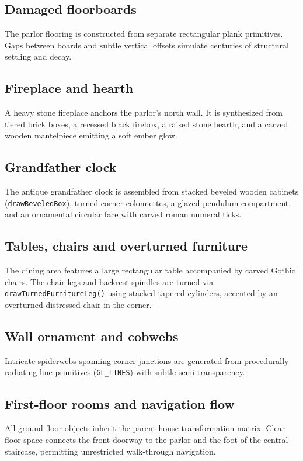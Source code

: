 \documentclass[10pt,a4paper,oneside]{article}
\begin{document}
\subsection{Damaged floorboards}
The parlor flooring is constructed from separate rectangular plank primitives. Gaps between boards and subtle vertical offsets simulate centuries of structural settling and decay.

\subsection{Fireplace and hearth}
A heavy stone fireplace anchors the parlor's north wall. It is synthesized from tiered brick boxes, a recessed black firebox, a raised stone hearth, and a carved wooden mantelpiece emitting a soft ember glow.

\subsection{Grandfather clock}
The antique grandfather clock is assembled from stacked beveled wooden cabinets (\texttt{drawBeveledBox}), turned corner colonnettes, a glazed pendulum compartment, and an ornamental circular face with carved roman numeral ticks.

\subsection{Tables, chairs and overturned furniture}
The dining area features a large rectangular table accompanied by carved Gothic chairs. The chair legs and backrest spindles are turned via \texttt{drawTurnedFurnitureLeg()} using stacked tapered cylinders, accented by an overturned distressed chair in the corner.

\subsection{Wall ornament and cobwebs}
Intricate spiderwebs spanning corner junctions are generated from procedurally radiating line primitives (\texttt{GL\_LINES}) with subtle semi-transparency.

\subsection{First-floor rooms and navigation flow}
All ground-floor objects inherit the parent house transformation matrix. Clear floor space connects the front doorway to the parlor and the foot of the central staircase, permitting unrestricted walk-through navigation.
\end{document}
